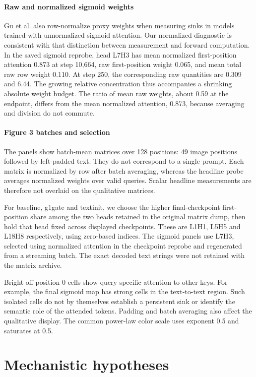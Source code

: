 \documentclass{article}
\begin{document}
\paragraph{Raw and normalized sigmoid weights} Gu et al. \cite{ref6} also row-normalize proxy weights when measuring sinks in models trained with unnormalized sigmoid attention. Our normalized diagnostic is consistent with that distinction between measurement and forward computation. In the saved sigmoid reprobe, head L7H3 has mean normalized first-position attention 0.873 at step 10,664, raw first-position weight 0.065, and mean total raw row weight 0.110. At step 250, the corresponding raw quantities are 0.309 and 6.44. The growing relative concentration thus accompanies a shrinking absolute weight budget. The ratio of mean raw weights, about 0.59 at the endpoint, differs from the mean normalized attention, 0.873, because averaging and division do not commute.

\paragraph{Figure 3 batches and selection} The panels show batch-mean matrices over 128 positions: 49 image positions followed by left-padded text. They do not correspond to a single prompt. Each matrix is normalized by row after batch averaging, whereas the headline probe averages normalized weights over valid queries. Scalar headline measurements are therefore not overlaid on the qualitative matrices.

For baseline, g1gate and textinit, we choose the higher final-checkpoint first-position share among the two heads retained in the original matrix dump, then hold that head fixed across displayed checkpoints. These are L1H1, L5H5 and L18H8 respectively, using zero-based indices. The sigmoid panels use L7H3, selected using normalized attention in the checkpoint reprobe and regenerated from a streaming batch. The exact decoded text strings were not retained with the matrix archive.

Bright off-position-0 cells show query-specific attention to other keys. For example, the final sigmoid map has strong cells in the text-to-text region. Such isolated cells do not by themselves establish a persistent sink or identify the semantic role of the attended tokens. Padding and batch averaging also affect the qualitative display. The common power-law color scale uses exponent 0.5 and saturates at 0.5.

\FloatBarrier
\section{Mechanistic hypotheses}
\end{document}
